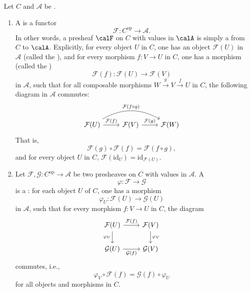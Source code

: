 \begin{definition} \label{definition:presheaf_on_a_category}
    Let $C$ and $\mathcal{A}$ be . 
    \begin{enumerate}
        \item A  is a functor
        $$\mathcal{F}: C^{\mathrm{op}} \to \mathcal{A}.$$
        In other words, a presheaf $\calF$ on $C$ with values in $\calA$ is simply a  from $C$ to $\calA$. 
        Explicitly, for every object $U$ in $C$, one has an object $\mathcal{F}(U)$ in $\mathcal{A}$ (called the ), and for every morphism $f: V \to U$ in $C$, one has a morphism (called the )
        $$\mathcal{F}(f): \mathcal{F}(U) \to \mathcal{F}(V)$$
        in $\mathcal{A}$, such that for all composable morphisms $W \xrightarrow{g} V \xrightarrow{f} U$ in $C$, the following diagram in $\mathcal{A}$ commutes:
        $$\begin{tikzcd}
        \mathcal{F}(U) \arrow[r, "\mathcal{F}(f)"] \arrow[rr, bend left, "\mathcal{F}(f \circ g)"] & \mathcal{F}(V) \arrow[r, "\mathcal{F}(g)"] & \mathcal{F}(W)
        \end{tikzcd}$$
        That is,
        $$\mathcal{F}(g) \circ \mathcal{F}(f) = \mathcal{F}(f \circ g),$$
        and for every object $U$ in $C$, $\mathcal{F}(\mathrm{id}_U) = \mathrm{id}_{\mathcal{F}(U)}$.


        \item 
        Let $\mathcal{F},\mathcal{G}: C^{\mathrm{op}} \to \mathcal{A}$ be two presheaves on $C$ with values in $\mathcal{A}$. A 
        $$\varphi: \mathcal{F} \to \mathcal{G}$$
        is a : for each object $U$ of $C$, one has a morphism
        $$\varphi_U: \mathcal{F}(U) \to \mathcal{G}(U)$$
        in $\mathcal{A}$, such that for every morphism $f: V \to U$ in $C$, the diagram
        $$\begin{tikzcd}
        \mathcal{F}(U) \arrow[r, "\mathcal{F}(f)"] \arrow[d, "\varphi_U"'] & \mathcal{F}(V) \arrow[d, "\varphi_V"] \\
        \mathcal{G}(U) \arrow[r, "\mathcal{G}(f)"'] & \mathcal{G}(V)
        \end{tikzcd}$$
        commutes, i.e.,
        $$\varphi_V \circ \mathcal{F}(f) = \mathcal{G}(f) \circ \varphi_U$$
        for all objects and morphisms in $C$.


\end{enumerate}
\end{definition}
